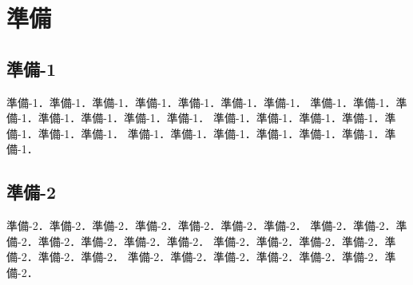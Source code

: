 ﻿%
\chapter{準備}

\section{準備-1}

準備-1．準備-1．準備-1．準備-1．準備-1．準備-1．準備-1．
準備-1．準備-1．準備-1．準備-1．準備-1．準備-1．準備-1．
準備-1．準備-1．準備-1．準備-1．準備-1．準備-1．準備-1．
準備-1．準備-1．準備-1．準備-1．準備-1．準備-1．準備-1．


\section{準備-2}

準備-2．準備-2．準備-2．準備-2．準備-2．準備-2．準備-2．
準備-2．準備-2．準備-2．準備-2．準備-2．準備-2．準備-2．
準備-2．準備-2．準備-2．準備-2．準備-2．準備-2．準備-2．
準備-2．準備-2．準備-2．準備-2．準備-2．準備-2．準備-2．

